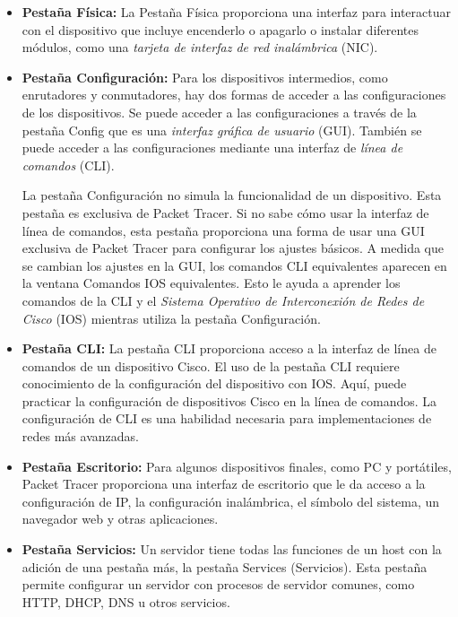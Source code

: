 \documentclass{article}
\begin{document}
   \begin{itemize}
        \item \textbf{Pestaña Física:} La Pestaña Física proporciona una interfaz para interactuar con el dispositivo que incluye encenderlo o apagarlo o instalar diferentes módulos, como una \textit{tarjeta de interfaz de red inalámbrica} (NIC).
        \item \textbf{Pestaña Configuración:} Para los dispositivos intermedios, como enrutadores y conmutadores, hay dos formas de acceder a las configuraciones de los dispositivos. Se puede acceder a las configuraciones a través de la pestaña Config que es una \textit{interfaz gráfica de usuario} (GUI). También se puede acceder a las configuraciones mediante una interfaz de \textit{línea de comandos} (CLI).

La pestaña Configuración no simula la funcionalidad de un dispositivo. Esta pestaña es exclusiva de Packet Tracer. Si no sabe cómo usar la interfaz de línea de comandos, esta pestaña proporciona una forma de usar una GUI exclusiva de Packet Tracer para configurar los ajustes básicos. A medida que se cambian los ajustes en la GUI, los comandos CLI equivalentes aparecen en la ventana Comandos IOS equivalentes. Esto le ayuda a aprender los comandos de la CLI y el \textit{Sistema Operativo de Interconexión de Redes de Cisco} (IOS) mientras utiliza la pestaña Configuración.
        \item \textbf{Pestaña CLI:} La pestaña CLI proporciona acceso a la interfaz de línea de comandos de un dispositivo Cisco. El uso de la pestaña CLI requiere conocimiento de la configuración del dispositivo con IOS. Aquí, puede practicar la configuración de dispositivos Cisco en la línea de comandos. La configuración de CLI es una habilidad necesaria para implementaciones de redes más avanzadas.
        \item \textbf{Pestaña Escritorio:} Para algunos dispositivos finales, como PC y portátiles, Packet Tracer proporciona una interfaz de escritorio que le da acceso a la configuración de IP, la configuración inalámbrica, el símbolo del sistema, un navegador web y otras aplicaciones.
        \item \textbf{Pestaña Servicios:} Un servidor tiene todas las funciones de un host con la adición de una pestaña más, la pestaña Services (Servicios). Esta pestaña permite configurar un servidor con procesos de servidor comunes, como HTTP, DHCP, DNS u otros servicios.
    \end{itemize}
\end{document}
